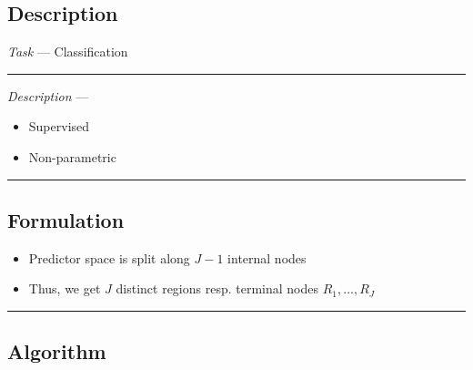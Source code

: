 \subsection*{Description}
\emph{Task} --- Classification

{\color{lightgray}\hrule height 0.001mm}

\emph{Description} --- 
\begin{itemize}
    \item Supervised
    \item Non-parametric
\end{itemize}

{\color{black}\hrule height 0.001mm}

\subsection*{Formulation}
\begin{itemize}
    \item Predictor space is split along $J-1$ internal nodes
    \item Thus, we get $J$ distinct regions resp. terminal nodes $R_1, ..., R_J$
\end{itemize}

{\color{black}\hrule height 0.001mm}
    
\subsection*{Algorithm}

